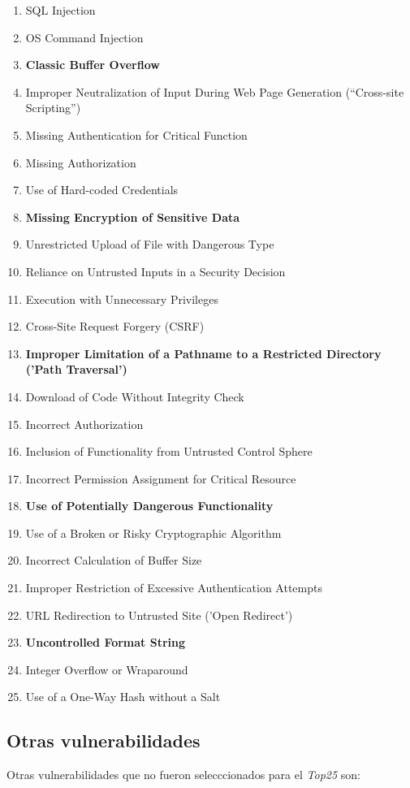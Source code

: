 \documentclass[a4paper,10pt]{article}
\begin{document}
\begin{enumerate}
    \item SQL Injection
    \item OS Command Injection
    \item \textbf{Classic Buffer Overflow}
    \item Improper Neutralization of Input During Web Page Generation (``Cross-site Scripting'')
    \item Missing Authentication for Critical Function
    \item Missing Authorization
    \item Use of Hard-coded Credentials
    \item \textbf{Missing Encryption of Sensitive Data}
    \item Unrestricted Upload of File with Dangerous Type
    \item Reliance on Untrusted Inputs in a Security Decision
    \item Execution with Unnecessary Privileges
    \item Cross-Site Request Forgery (CSRF)
    \item \textbf{Improper Limitation of a Pathname to a Restricted Directory ('Path Traversal')}
    \item Download of Code Without Integrity Check
    \item Incorrect Authorization
    \item Inclusion of Functionality from Untrusted Control Sphere
    \item Incorrect Permission Assignment for Critical Resource
    \item \textbf{Use of Potentially Dangerous Functionality}
    \item Use of a Broken or Risky Cryptographic Algorithm
    \item Incorrect Calculation of Buffer Size
    \item Improper Restriction of Excessive Authentication Attempts
    \item URL Redirection to Untrusted Site ('Open Redirect')
    \item \textbf{Uncontrolled Format String}
    \item Integer Overflow or Wraparound
    \item Use of a One-Way Hash without a Salt
\end{enumerate}

\subsection{Otras vulnerabilidades}
Otras vulnerabilidades que no fueron selecccionados para el \emph{Top25} son:
\end{document}
